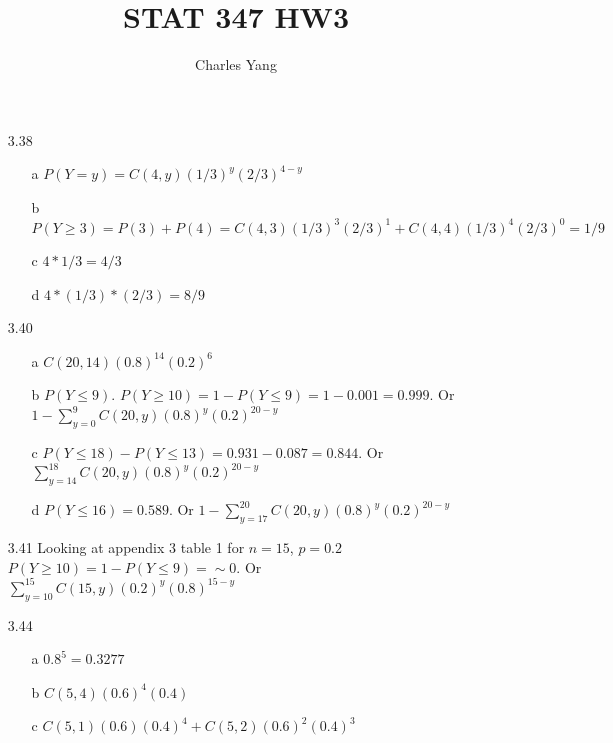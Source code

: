 \documentclass[11pt]{article}
\title{STAT 347 HW3}
\author{Charles Yang}
\begin{document}
    \maketitle

    \begin{enumerate}
        \item[3.38]
        \begin{enumerate}
            \item[a] $P(Y = y) = C(4,y)(1/3)^{y}(2/3)^{4-y}$
            \item[b] $P(Y \geq 3) = P(3) + P(4) = C(4,3)(1/3)^{3}(2/3)^{1} + C(4,4)(1/3)^{4}(2/3)^{0} = 1/9$
            \item[c] $4*1/3 = 4/3$
            \item[d] $4*(1/3)*(2/3) = 8/9$
        \end{enumerate}

        \item[3.40]
        \begin{enumerate}
            Looking at appendix 3 table 1 for $p = 0.8$ and $n = 20$
            \item[a] $C(20,14)(0.8)^{14}(0.2)^6$
            \item[b] $P(Y \leq 9)$. $P(Y \geq 10) = 1 - P(Y \leq 9) = 1- 0.001 = 0.999$. Or $1- \sum_{y=0}^{9} C(20, y)(0.8)^y(0.2)^{20-y}$
            \item[c] $P(Y \leq 18) - P(Y \leq 13) = 0.931 - 0.087 = 0.844$. Or $\sum_{y=14}^{18} C(20, y)(0.8)^y(0.2)^{20-y}$
            \item[d] $P(Y \leq 16) = 0.589$. Or $1 - \sum_{y=17}^{20} C(20, y)(0.8)^y(0.2)^{20-y}$
        \end{enumerate}

        \item[3.41] Looking at appendix 3 table 1 for $n = 15$, $p = 0.2$ \\
        $P(Y \geq 10) = 1 - P(Y \leq 9) = \sim0$. Or $\sum_{y = 10}^{15} C(15, y)(0.2)^y(0.8)^{15-y}$

        \item[3.44]
        \begin{enumerate}
            \item[a] $0.8^5 = 0.3277$
            \item[b] $C(5, 4)(0.6)^4(0.4)$
            \item[c] $C(5, 1)(0.6)(0.4)^4 + C(5, 2)(0.6)^2(0.4)^3$
        \end{enumerate}


\end{enumerate}
\end{document}
